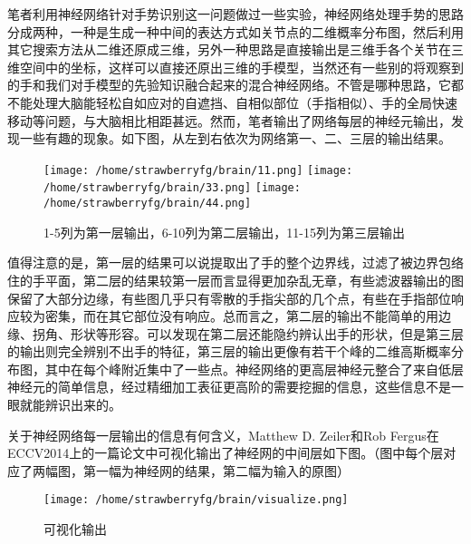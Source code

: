 \documentclass{article}
\begin{document}
\begin{spacing}{1.0}
	笔者利用神经网络针对手势识别这一问题做过一些实验，神经网络处理手势的思路分成两种，一种是生成一种中间的表达方式如关节点的二维概率分布图，然后利用其它搜索方法从二维还原成三维，另外一种思路是直接输出是三维手各个关节在三维空间中的坐标，这样可以直接还原出三维的手模型，当然还有一些别的将观察到的手和我们对手模型的先验知识融合起来的混合神经网络。不管是哪种思路，它都不能处理大脑能轻松自如应对的自遮挡、自相似部位（手指相似）、手的全局快速移动等问题，与大脑相比相距甚远。然而，笔者输出了网络每层的神经元输出，发现一些有趣的现象。如下图，从左到右依次为网络第一、二、三层的输出结果。
\begin{figure}[htbp]
\centering
\texttt{[image: /home/strawberryfg/brain/11.png]}
\texttt{[image: /home/strawberryfg/brain/33.png]}
\texttt{[image: /home/strawberryfg/brain/44.png]}
\caption{1-5列为第一层输出，6-10列为第二层输出，11-15列为第三层输出}
\end{figure}\par 
	值得注意的是，第一层的结果可以说提取出了手的整个边界线，过滤了被边界包络住的手平面，第二层的结果较第一层而言显得更加杂乱无章，有些滤波器输出的图保留了大部分边缘，有些图几乎只有零散的手指尖部的几个点，有些在手指部位响应较为密集，而在其它部位没有响应。总而言之，第二层的输出不能简单的用边缘、拐角、形状等形容。可以发现在第二层还能隐约辨认出手的形状，但是第三层的输出则完全辨别不出手的特征，第三层的输出更像有若干个峰的二维高斯概率分布图，其中在每个峰附近集中了一些点。神经网络的更高层神经元整合了来自低层神经元的简单信息，经过精细加工表征更高阶的需要挖掘的信息，这些信息不是一眼就能辨识出来的。\par 
	关于神经网络每一层输出的信息有何含义，Matthew D. Zeiler和Rob Fergus在ECCV2014上的一篇论文\cite{visualize}中可视化输出了神经网的中间层如下图。（图中每个层对应了两幅图，第一幅为神经网的结果，第二幅为输入的原图）
 \begin{figure}[htbp]
\centering
\texttt{[image: /home/strawberryfg/brain/visualize.png]}
\caption{\cite{visualize}可视化输出}
\end{figure}\par 	
	

\end{spacing}
\end{document}
